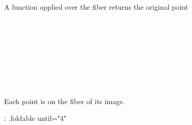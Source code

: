A function applied over the fiber returns the original point

\begin{code}%
%
\>[2]\<%
\\
%
\>[2]\<%
\\
\>[2][@{}l@{\AgdaIndent{0}}]%
\>[4]\AgdaSymbol{:}\AgdaSpace{}%
\AgdaSpace{}%
\AgdaSymbol{\{}\AgdaSpace{}%
\AgdaSymbol{:}\AgdaSpace{}%
\AgdaSpace{}%
\AgdaSpace{}%
\AgdaSymbol{\}}\AgdaSpace{}%
\AgdaSymbol{\{}\AgdaSpace{}%
\AgdaSymbol{:}\AgdaSpace{}%
\AgdaSymbol{\}}\<%
\\
%
\>[4]\AgdaSpace{}%
\AgdaSymbol{(}\AgdaSpace{}%
\AgdaSymbol{:}\AgdaSpace{}%
\AgdaSpace{}%
\AgdaSpace{}%
\AgdaSymbol{)}\<%
\\
%
\>[4]\AgdaComment{---------------}\<%
\\
%
\>[4]\AgdaSpace{}%
\AgdaSpace{}%
\AgdaSymbol{(}\AgdaSpace{}%
\AgdaSymbol{)}\AgdaSpace{}%
\AgdaOperator{\AgdaDatatype{==}}\AgdaSpace{}%
\<%
\\
%
\\[\AgdaEmptyExtraSkip]%
%
\>[2]\AgdaSpace{}%
\AgdaSymbol{(}\AgdaSpace{}%
\AgdaOperator{\AgdaInductiveConstructor{,}}\AgdaSpace{}%
\AgdaSymbol{)}\AgdaSpace{}%
\AgdaSymbol{=}\AgdaSpace{}%
\<%
\end{code}

Each point is on the fiber of its image.

{: .foldable until="4"}
\begin{code}%
%
\>[2]\<%
\\
%
\>[2]\<%
\\
\>[2][@{}l@{\AgdaIndent{0}}]%
\>[4]\AgdaSymbol{:}%
\>[7]\AgdaSpace{}%
\AgdaSymbol{\{}\AgdaSpace{}%
\AgdaSymbol{:}\AgdaSpace{}%
\AgdaSpace{}%
\AgdaSpace{}%
\AgdaSymbol{\}}\AgdaSpace{}%
\AgdaSpace{}%
\AgdaSymbol{\{}\AgdaSpace{}%
\AgdaSymbol{:}\AgdaSpace{}%
\AgdaSymbol{\}}\<%
\\
%
\>[4]\AgdaSpace{}%
\AgdaSpace{}%
\AgdaSpace{}%
\AgdaSymbol{(}\AgdaSpace{}%
\AgdaSymbol{)}\<%
\\
%
\\[\AgdaEmptyExtraSkip]%
%
\>[2]\AgdaSpace{}%
\AgdaSymbol{\{}\AgdaSymbol{\}}\AgdaSpace{}%
\AgdaSymbol{\{}\AgdaSymbol{\}}\AgdaSpace{}%
\AgdaSymbol{=}\AgdaSpace{}%
\AgdaSpace{}%
\AgdaOperator{\AgdaInductiveConstructor{,}}\AgdaSpace{}%
\AgdaSpace{}%
\AgdaSymbol{(}\AgdaSpace{}%
\AgdaSymbol{)}\<%
\end{code}
